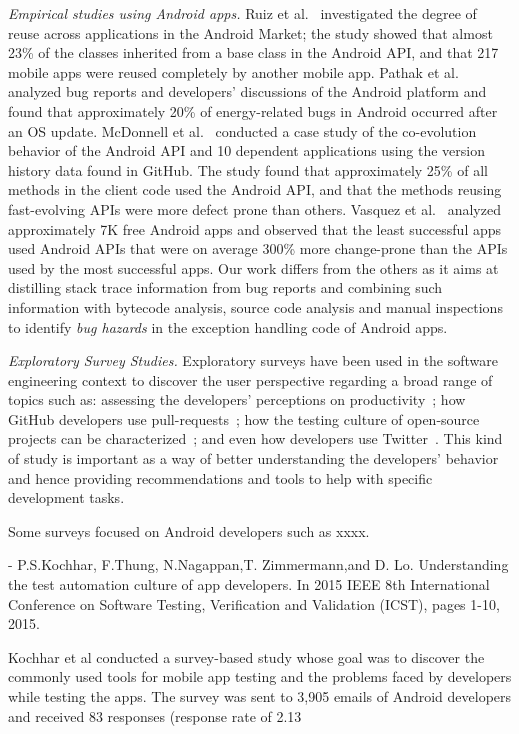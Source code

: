 \textit{Empirical studies using Android apps.} Ruiz et al.~\cite{Ruiz12}
investigated the degree of reuse across applications in the Android Market; the
study showed that almost 23\% of the classes inherited from a base class in the
Android API, and that 217 mobile apps were reused completely by another mobile
app. Pathak et al.~\cite{Patha11} analyzed bug reports and developers'
discussions of the Android platform and found that approximately 20\% of
energy-related bugs in Android occurred after an OS update. McDonnell et
al.~\cite{McDon13} conducted a case study of the co-evolution behavior of
the Android API and 10 dependent applications using the version history data found
in GitHub. The study found that approximately 25\% of all methods in the client
code used the Android API, and that the methods reusing fast-evolving APIs were
more defect prone than others. Vasquez et al.~\cite{Linar13} analyzed
approximately 7K free Android apps and observed that the least successful apps
used Android APIs that were on average 300\% more change-prone than the APIs
used by the most successful apps. Our work differs from the others as it aims at
distilling stack trace information from bug reports and combining such information
with bytecode analysis, source code analysis and manual inspections
to identify \emph{bug hazards} in the exception handling code of Android apps.

\textit{Exploratory Survey Studies.} Exploratory surveys have been used in the software
engineering context to discover the user perspective regarding a broad range of 
topics such as: assessing the developers' perceptions on productivity~\cite{meyer2014}; 
how GitHub developers use pull-requests~\cite{gousios2015}; 
how the testing culture of open-source projects can be characterized~\cite{pham2013}; 
and even how developers use Twitter~\cite{singer2014}. This kind of study is important as a way of 
better understanding the developers' behavior and hence providing recommendations and 
tools to help with specific development tasks. 

Some surveys focused on Android developers such as xxxx.

- P.S.Kochhar, F.Thung, N.Nagappan,T. Zimmermann,and D. Lo. Understanding the test automation culture of app developers. In 2015 IEEE 8th International Conference on Software Testing, Verification and Validation (ICST), pages 1-10, 2015.

Kochhar et al conducted a survey-based study whose goal was to discover the commonly used tools for mobile app testing and the problems faced by developers while testing the apps. The survey was sent to 3,905 emails of Android developers and received 83 responses (response rate of 2.13%



